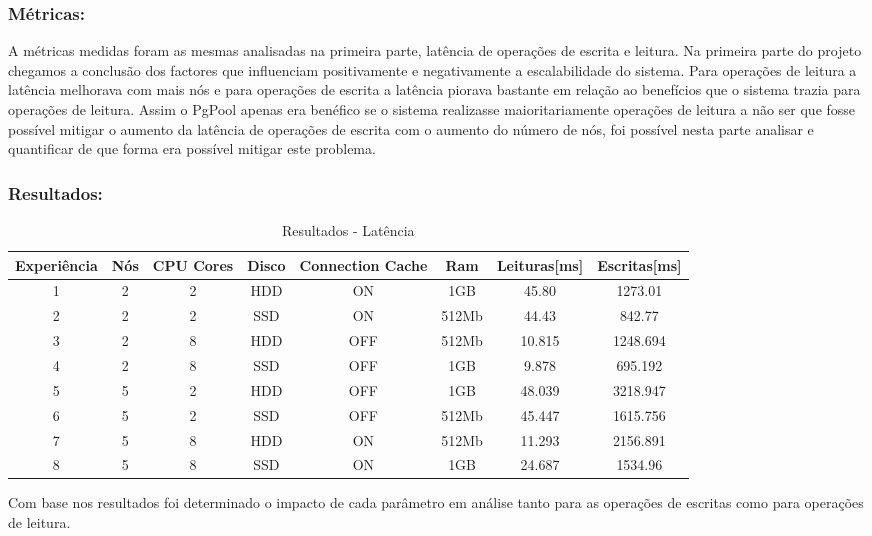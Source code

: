 \subsubsection{Métricas:}
A métricas medidas foram as mesmas analisadas na primeira parte, latência de operações de escrita e leitura. Na primeira parte do projeto chegamos a conclusão dos factores que influenciam positivamente e negativamente a escalabilidade do sistema.\newline
Para operações de leitura a latência melhorava com mais nós e para operações de escrita a latência piorava bastante em relação ao benefícios que o sistema trazia para operações de leitura. Assim o PgPool apenas era benéfico se o sistema realizasse maioritariamente operações de leitura a não ser que fosse possível mitigar o aumento da latência de operações de escrita com o aumento do número de nós, foi possível nesta parte analisar e quantificar de que forma era possível mitigar este problema.

\subsubsection{Resultados:}
\begin{table}
    \centering
    \begin{tabular}{|| c | c | c | c | c | c | c | c ||} 
         \hline
         Experiência & Nós & CPU Cores & Disco & Connection Cache & Ram & Leituras[ms] & Escritas[ms]\\ [0.5ex] 
         \hline\hline
         1 & 2 & 2 & HDD & ON & 1GB & 45.80 & 1273.01\\ 
         \hline
         2 & 2 & 2 & SSD & ON & 512Mb & 44.43 & 842.77\\ 
         \hline
         3 & 2 & 8 & HDD & OFF & 512Mb & 10.815 & 1248.694\\ 
         \hline
         4 & 2 & 8 & SSD & OFF & 1GB & 9.878 & 695.192\\ 
         \hline
         5 & 5 & 2 & HDD & OFF & 1GB & 48.039 & 3218.947\\ 
         \hline
         6 & 5 & 2 & SSD & OFF & 512Mb & 45.447 & 1615.756\\ 
         \hline
         7 & 5 & 8 & HDD & ON & 512Mb & 11.293 & 2156.891\\ 
         \hline
         8 & 5 & 8 & SSD & ON & 1GB & 24.687 & 1534.96\\ 
         \hline
    \end{tabular}
    \caption{Resultados - Latência}
\end{table}
Com base nos resultados foi determinado o impacto de cada parâmetro em análise tanto para as operações de escritas como para operações de leitura.

